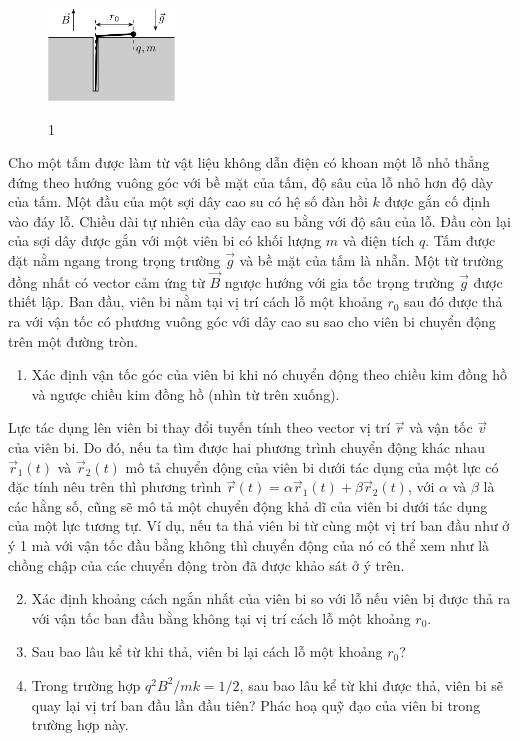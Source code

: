 \vspace{-1cm}
\begin{figure}
  \centering
  \includegraphics[width=0.3\textwidth]{Figures/Fig 1.jpg}
  \begin{center}
    \figurename{ 1}
  \end{center}
\end{figure}

\noindent Cho một tấm được làm từ vật liệu không dẫn điện có khoan một lỗ nhỏ thẳng đứng theo hướng vuông góc với bề mặt của tấm, độ sâu của lỗ nhỏ hơn độ dày của tấm. Một đầu của một sợi dây cao su có hệ số đàn hồi $k$ được gắn cố định vào đáy lỗ. Chiều dài tự nhiên của dây cao su bằng với độ sâu của lỗ. Đầu còn lại của sợi dây được gắn với một viên bi có khối lượng $m$ và điện tích $q$. Tấm được đặt nằm ngang trong trọng trường $\vec{g}$ và bề mặt của tấm là nhẵn. Một từ trường đồng nhất có vector cảm ứng từ $\vec{B}$ ngược hướng với gia tốc trọng trường $\vec{g}$ được thiết lập. Ban đầu, viên bi nằm tại vị trí cách lỗ một khoảng $r_{0}$ sau đó được thả ra với vận tốc có phương vuông góc với dây cao su sao cho viên bi chuyển động trên một đường tròn.
\begin{enumerate}
  \item Xác định vận tốc góc của viên bi khi nó chuyển động theo chiều kim đồng hồ và ngược chiều kim đồng hồ (nhìn từ trên xuống).
\end{enumerate}
\noindent Lực tác dụng lên viên bi thay đổi tuyến tính theo vector vị trí $\vec{r}$ và vận tốc $\vec{v}$ của viên bi. Do đó, nếu ta tìm được hai phương trình chuyển động khác nhau $\vec{r}_{1}(t)$ và $\vec{r}_{2}(t)$ mô tả chuyển động của viên bi dưới tác dụng của một lực có đặc tính nêu trên thì phương trình $\vec{r}(t)=\alpha\vec{r}_{1}(t)+\beta\vec{r}_{2}(t)$, với $\alpha$ và $\beta$ là các hằng số, cũng sẽ mô tả một chuyển động khả dĩ của viên bi dưới tác dụng của một lực tương tự. Ví dụ, nếu ta thả viên bi từ cùng một vị trí ban đầu như ở ý 1 mà với vận tốc đầu bằng không thì chuyển động của nó có thể xem như là chồng chập của các chuyển động tròn đã được khảo sát ở ý trên.

\begin{enumerate}
  \setcounter{enumi}{1}
  \item Xác định khoảng cách ngắn nhất của viên bi so với lỗ nếu viên bị được thả ra với vận tốc ban đầu bằng không tại vị trí cách lỗ một khoảng $r_{0}$.
  \item Sau bao lâu kể từ khi thả, viên bi lại cách lỗ một khoảng $r_{0}$?
  \item Trong trường hợp $q^{2}B^{2}/mk=1/2$, sau bao lâu kể từ khi được thả, viên bi sẽ quay lại vị trí ban đầu lần đầu tiên? Phác hoạ quỹ đạo của viên bi trong trường hợp này.
\end{enumerate}
